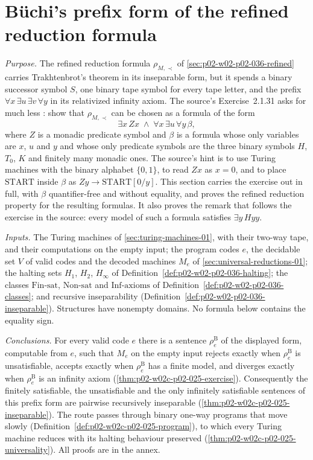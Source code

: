 \section{B\"uchi's prefix form of the refined reduction formula}
\label{sec:p02-w02c-p02-025-buchi-form}

\emph{Purpose.}  The refined reduction formula \(\rho_{M,\prec}\) of
\cref{sec:p02-w02-p02-036-refined} carries Trakhtenbrot's theorem in its
inseparable form, but it spends a binary successor symbol \(S\), one binary
tape symbol for every tape letter, and the prefix
\(\forall x\,\exists u\,\exists v\,\forall y\) in its relativized infinity
axiom.  The source's Exercise~2.1.31 asks for much less
\cite[Sect.~2.1.2, Exercise~2.1.31, pp.~35--36]{BorgerGradelGurevich1997}:
show that \(\rho_{M,\prec}\) can be chosen as a formula of the form
\[
 \exists x\,Zx\;\land\;\forall x\,\exists u\,\forall y\,\beta ,
\]
where \(Z\) is a monadic predicate symbol and \(\beta\) is a formula whose only
variables are \(x\), \(u\) and \(y\) and whose only predicate symbols are the
three binary symbols \(H\), \(T_0\), \(K\) and finitely many monadic ones.  The
source's hint is to use Turing machines with the binary alphabet \(\{0,1\}\),
to read \(Zx\) as \(x=0\), and to place \(\mathrm{START}\) inside \(\beta\) as
\(Zy\to\mathrm{START}[0/y]\).  This section carries the exercise out in full,
with \(\beta\) quantifier-free and without equality, and proves the refined
reduction property for the resulting formulas.  It also proves the remark that
follows the exercise in the source: every model of such a formula satisfies
\(\exists y\,Hyy\).

\emph{Inputs.}  The Turing machines of \cref{sec:turing-machines-01}, with
their two-way tape, and their computations on the empty input;
the program codes \(e\), the decidable set \(V\) of valid codes and the decoded
machines \(M_e\) of \cref{sec:universal-reductions-01}; the halting sets
\(H_1\), \(H_2\), \(H_\infty\) of
Definition~\ref{def:p02-w02-p02-036-halting}; the classes
\(\mathrm{Fin\text{-}sat}\), \(\mathrm{Non\text{-}sat}\) and
\(\mathrm{Inf\text{-}axioms}\) of
Definition~\ref{def:p02-w02-p02-036-classes}; and recursive inseparability
(Definition~\ref{def:p02-w02-p02-036-inseparable}).  Structures have nonempty
domains.  No formula below contains the equality sign.

\emph{Conclusions.}  For every valid code \(e\) there is a sentence
\(\rho^{\mathrm B}_{e}\) of the displayed form, computable from \(e\), such that
\(M_e\) on the empty input rejects exactly when \(\rho^{\mathrm B}_e\) is
unsatisfiable, accepts exactly when \(\rho^{\mathrm B}_e\) has a finite model, and
diverges exactly when \(\rho^{\mathrm B}_e\) is an infinity axiom
(\cref{thm:p02-w02c-p02-025-exercise}).  Consequently the finitely
satisfiable, the unsatisfiable and the only infinitely satisfiable sentences of
this prefix form are pairwise recursively inseparable
(\cref{thm:p02-w02c-p02-025-inseparable}).  The route passes through binary
one-way programs that move slowly
(Definition~\ref{def:p02-w02c-p02-025-program}), to which every Turing
machine reduces with its halting behaviour preserved
(\cref{thm:p02-w02c-p02-025-universality}).  All proofs are in the annex.

